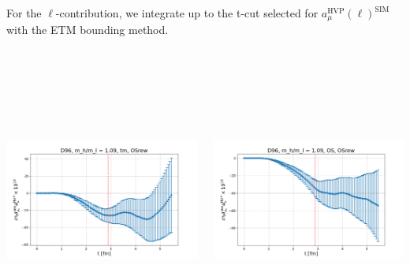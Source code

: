 \documentclass[xcolor={dvipsnames,table}]{beamer}
\begin{document}
\begin{frame}
  For the $\ell$-contribution, we integrate up to the t-cut selected for $a_\mu^\mathrm{HVP}(\ell)^\mathrm{SIM}$ with the ETM bounding method.\vfill \,

  \

  \

  \

  \begin{columns}
    \begin{column}{0.5\textwidth}
      \includegraphics[trim=0cm 0.3cm 0cm 1.2cm, clip,width=\textwidth]{plots/der_mq_sea_lore/amu_D96_tm_der_001ml.png}
    \end{column}
    \begin{column}{0.5\textwidth}
      \includegraphics[trim=0cm 0.3cm 0cm 1.2cm, clip,width=\textwidth]{plots/der_mq_sea_lore/amu_D96_OS_der_001ml.png}
    \end{column}
  \end{columns}
  \

  \

  \

  \
\end{frame}
\end{document}
